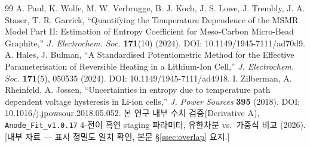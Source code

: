\documentclass[11pt,a4paper]{article}
\begin{document}
\begin{thebibliography}{99}
 A. Paul, K. Wolfe, M. W. Verbrugge, B. J. Koch, J. S. Lowe, J. Trembly, J. A. Staser, T. R. Garrick, ``Quantifying the Temperature Dependence of the MSMR Model Part II: Estimation of Entropy Coefficient for Meso-Carbon Micro-Bead Graphite,'' \emph{J. Electrochem. Soc.} \textbf{171}(10) (2024). DOI: 10.1149/1945-7111/ad70d9.
 A. Hales, J. Bulman, ``A Standardised Potentiometric Method for the Effective Parameterisation of Reversible Heating in a Lithium-Ion Cell,'' \emph{J. Electrochem. Soc.} \textbf{171}(5), 050535 (2024). DOI: 10.1149/1945-7111/ad4918.
 I. Zilberman, A. Rheinfeld, A. Jossen, ``Uncertainties in entropy due to temperature path dependent voltage hysteresis in Li-ion cells,'' \emph{J. Power Sources} \textbf{395} (2018). DOI: 10.1016/j.jpowsour.2018.05.052.
 본 연구 내부 수치 검증(Derivative A), \texttt{Anode\_Fit\_v1.0.17} 4-전이 흑연 staging 파라미터, 유한차분 vs.\ 가중식 비교 (2026). [내부 자료 — 표시 정밀도 일치 확인, 본문 \S\ref{ssec:overlap} 요지.]
\end{thebibliography}
\end{document}
